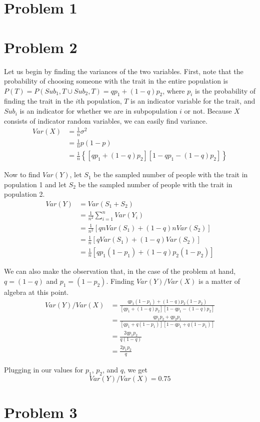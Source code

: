 \documentclass{article}
\begin{document}
\thispagestyle{fancy}

\section*{Problem 1}



\section*{Problem 2}

Let us begin by finding the variances of the two variables. First, note that
the probability of choosing someone with the trait in the entire population is
$P(T) = P(Sub_1,T\cup Sub_2,T) = qp_1 + ( 1 - q )p_2$, where $p_i$ is the
probability of finding the trait in the $i$th population, $T$ is an indicator
variable for the trait, and $Sub_i$ is an indicator for whether we are in
subpopulation $i$ or not. Because $X$ consists of indicator random variables,
we can easily find variance.
\begin{align*}
  Var(X) &= \frac{1}{n}\sigma^2 \\
         &= \frac{1}{n}p(1-p) \\
         &= \frac{1}{n}\left\{[qp_1 + (1-q)p_2][1 - qp_1 - (1-q)p_2]\right\}
\end{align*}

Now to find $Var(Y)$, let $S_1$ be the sampled number of people with the trait
in population 1 and let $S_2$ be the sampled number of people with the trait in
population 2.
\begin{align*}
  Var(Y) &= Var(S_1 + S_2) \\
         &= \frac{1}{n^2}\sum\limits_{i = 1}^{n} Var( Y_i ) \\
         &= \frac{1}{n^2}\left[qnVar( S_1 ) + (1-q)nVar( S_2 ) \right] \\
         &= \frac{1}{n} [qVar( S_1 ) + (1-q)Var(S_2)] \\
         &= \frac{1}{n} [qp_1(1-p_1) + (1-q)p_2(1-p_2)]
\end{align*}

We can also make the observation that, in the case of the problem at hand, $q =
(1-q)$ and $p_1 = (1 - p_2)$. Finding $Var(Y)/Var(X)$ is a matter of algebra at
this point.
\begin{align*}
  Var(Y)/Var(X) &= \frac{qp_1(1-p_1)+(1-q)p_2(1-p_2)}{[qp_1+(1-q)p_2]
[1-qp_1-(1-q)p_2]} \\
&= \frac{qp_1p_2 + qp_2p_1}{[qp_1+q(1-p_1)][1-qp_1+q(1-p_1)]} \\
&= \frac{2qp_1p_2}{q(1-q)} \\
&= \frac{2p_1p_2}{q}
\end{align*}

Plugging in our values for $p_1$, $p_2$, and $q$, we get
\begin{equation*}
  Var(Y)/Var(X) = 0.75
\end{equation*}

\section*{Problem 3}
\end{document}
